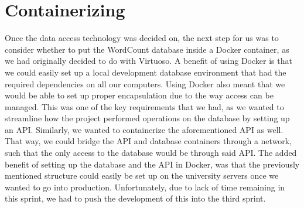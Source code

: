 \section{Containerizing}\label{sec:Containerizing}
Once the data access technology was decided on, the next step for us was to consider whether to put the WordCount database inside a Docker container, as we had originally decided to do with Virtuoso. A benefit of using Docker is that we could easily set up a local development database environment that had the required dependencies on all our computers. Using Docker also meant that we would be able to set up proper encapsulation due to the way access can be managed. This was one of the key requirements that we had, as we wanted to streamline how the \knox{} project performed operations on the database by setting up an API. 
Similarly, we wanted to containerize the aforementioned API as well. That way, we could bridge the API and database containers through a network, such that the only access to the database would be through said API.
The added benefit of setting up the database and the API in Docker, was that the previously mentioned structure could easily be set up on the university servers once we wanted to go into production.
Unfortunately, due to lack of time remaining in this sprint, we had to push the development of this into the third sprint.